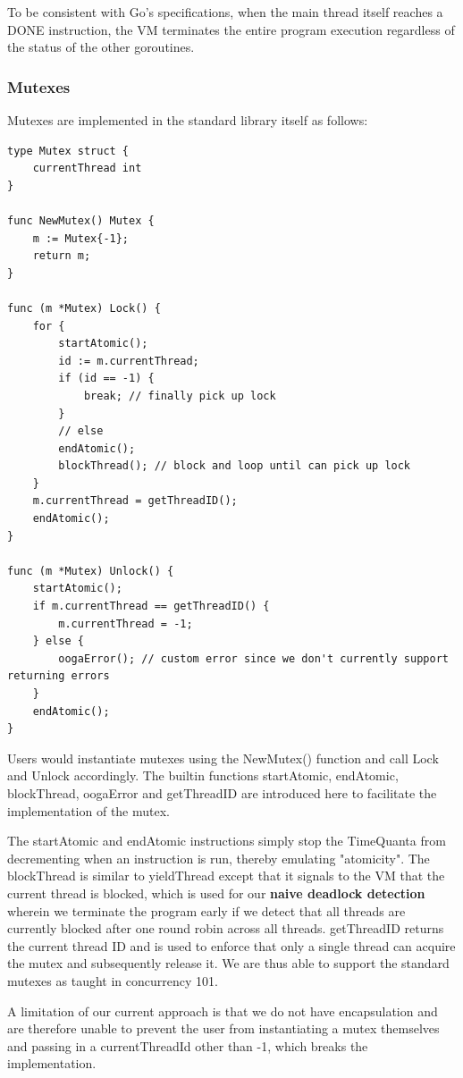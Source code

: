 \documentclass{report}
\begin{document}
To be consistent with Go's specifications, when the main thread itself reaches a DONE instruction, the VM terminates the entire program execution regardless of the status of the other goroutines.

\subsubsection{Mutexes}

Mutexes are implemented in the standard library itself as follows:

\begin{verbatim}
type Mutex struct {
    currentThread int
}

func NewMutex() Mutex {
    m := Mutex{-1};
    return m;
}

func (m *Mutex) Lock() {
    for {
        startAtomic();
        id := m.currentThread;
        if (id == -1) {
            break; // finally pick up lock
        }
        // else
        endAtomic();
        blockThread(); // block and loop until can pick up lock
    }
    m.currentThread = getThreadID();
    endAtomic();
}

func (m *Mutex) Unlock() {
    startAtomic();
    if m.currentThread == getThreadID() {
        m.currentThread = -1;
    } else {
        oogaError(); // custom error since we don't currently support returning errors
    }
    endAtomic();
}
\end{verbatim}

Users would instantiate mutexes using the NewMutex() function and call Lock and Unlock accordingly. The builtin functions startAtomic, endAtomic, blockThread, oogaError and getThreadID are introduced here to facilitate the implementation of the mutex.

The startAtomic and endAtomic instructions simply stop the TimeQuanta from decrementing when an instruction is run, thereby emulating "atomicity". The blockThread is similar to yieldThread except that it signals to the VM that the current thread is blocked, which is used for our \textbf{naive deadlock detection} wherein we terminate the program early if we detect that all threads are currently blocked after one round robin across all threads. getThreadID returns the current thread ID and is used to enforce that only a single thread can acquire the mutex and subsequently release it. We are thus able to support the standard mutexes as taught in concurrency 101.

A limitation of our current approach is that we do not have encapsulation and are therefore unable to prevent the user from instantiating a mutex themselves and passing in a currentThreadId other than -1, which breaks the implementation.
\end{document}
